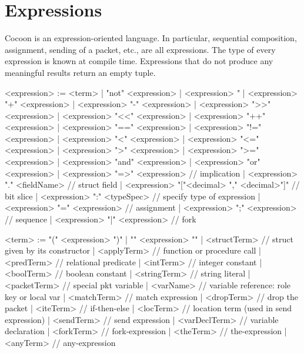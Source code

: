 \documentclass{report}
\begin{document}
\section{Expressions}\label{s:expr}

Cocoon is an expression-oriented language.  In particular, 
sequential composition, assignment, sending of a packet, etc., are 
all expressions.  The type of every expression is known at 
compile time.  Expressions that do not produce any meaningful 
results return an empty tuple.

\begin{bnflisting}{}
<expression> := 
          <term>
        | "not" <expression>
        | <expression> "%
        | <expression> "+" <expression>
        | <expression> "-" <expression>
        | <expression> ">>" <expression>
        | <expression> "<<" <expression>
        | <expression> "++" <expression>
        | <expression> "==" <expression>
        | <expression> "!=" <expression>
        | <expression> "<" <expression>
        | <expression> "<=" <expression>
        | <expression> ">" <expression>
        | <expression> ">=" <expression>
        | <expression> "and" <expression>
        | <expression> "or" <expression>
        | <expression> "=>" <expression>             // implication
        | <expression> "." <fieldName>               // struct field
        | <expression> "["<decimal> "," <decimal>"]" // bit slice
        | <expression> ":" <typeSpec>                // specify type of expression
        | <expression> "=" <expression>              // assignment
        | <expression> ";" <expression>              // sequence
        | <expression> "|" <expression>              // fork


<term> := "(" <expression> ")"
        | "{" <expression> "}"
        | <structTerm>   // struct given by its constructor
        | <applyTerm>    // function or procedure call
        | <predTerm>     // relational predicate 
        | <intTerm>      // integer constant
        | <boolTerm>     // boolean constant
        | <stringTerm>   // string literal
        | <packetTerm>   // special pkt variable
        | <varName>      // variable reference: role key or local var
        | <matchTerm>    // match expression
        | <dropTerm>     // drop the packet
        | <iteTerm>      // if-then-else
        | <locTerm>      // location term (used in send expression)
        | <sendTerm>     // send expression
        | <varDeclTerm>  // variable declaration
        | <forkTerm>     // fork-expression
        | <theTerm>      // the-expression
        | <anyTerm>      // any-expression
\end{bnflisting}
\end{document}
